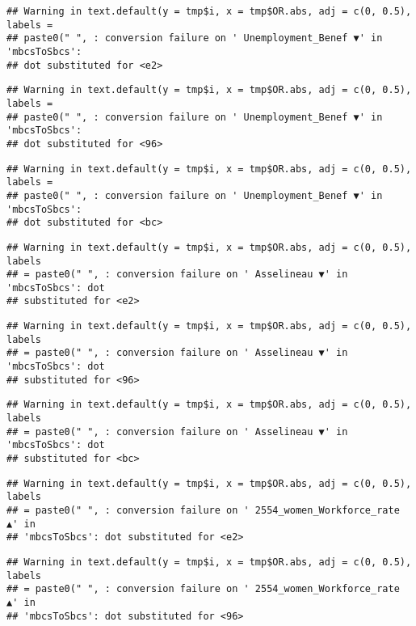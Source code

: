 \documentclass[
]{article}
\begin{document}
\begin{verbatim}
## Warning in text.default(y = tmp$i, x = tmp$OR.abs, adj = c(0, 0.5), labels =
## paste0(" ", : conversion failure on ' Unemployment_Benef ▼' in 'mbcsToSbcs':
## dot substituted for <e2>
\end{verbatim}

\begin{verbatim}
## Warning in text.default(y = tmp$i, x = tmp$OR.abs, adj = c(0, 0.5), labels =
## paste0(" ", : conversion failure on ' Unemployment_Benef ▼' in 'mbcsToSbcs':
## dot substituted for <96>
\end{verbatim}

\begin{verbatim}
## Warning in text.default(y = tmp$i, x = tmp$OR.abs, adj = c(0, 0.5), labels =
## paste0(" ", : conversion failure on ' Unemployment_Benef ▼' in 'mbcsToSbcs':
## dot substituted for <bc>
\end{verbatim}

\begin{verbatim}
## Warning in text.default(y = tmp$i, x = tmp$OR.abs, adj = c(0, 0.5), labels
## = paste0(" ", : conversion failure on ' Asselineau ▼' in 'mbcsToSbcs': dot
## substituted for <e2>
\end{verbatim}

\begin{verbatim}
## Warning in text.default(y = tmp$i, x = tmp$OR.abs, adj = c(0, 0.5), labels
## = paste0(" ", : conversion failure on ' Asselineau ▼' in 'mbcsToSbcs': dot
## substituted for <96>
\end{verbatim}

\begin{verbatim}
## Warning in text.default(y = tmp$i, x = tmp$OR.abs, adj = c(0, 0.5), labels
## = paste0(" ", : conversion failure on ' Asselineau ▼' in 'mbcsToSbcs': dot
## substituted for <bc>
\end{verbatim}

\begin{verbatim}
## Warning in text.default(y = tmp$i, x = tmp$OR.abs, adj = c(0, 0.5), labels
## = paste0(" ", : conversion failure on ' 2554_women_Workforce_rate ▲' in
## 'mbcsToSbcs': dot substituted for <e2>
\end{verbatim}

\begin{verbatim}
## Warning in text.default(y = tmp$i, x = tmp$OR.abs, adj = c(0, 0.5), labels
## = paste0(" ", : conversion failure on ' 2554_women_Workforce_rate ▲' in
## 'mbcsToSbcs': dot substituted for <96>
\end{verbatim}
\end{document}
